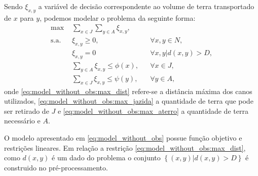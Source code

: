 Sendo $\xi_{x,y}$ a variável de decisão correspondente ao volume de terra
transportado de $x$ para $y$, podemos modelar o problema da seguinte forma:
\begin{subequations}
    \begin{align}
        \text{max } & \sum_{x \in J} \sum_{y \in A} \xi_{x,y},
        \label{eq:model_without_obs:obj_func} \\
        \text{s.a. } & \xi_{x,y} \geq 0, && \forall x, y \in N,
        \label{eq:model_without_obs:var} \\
        & \xi_{x,y} = 0 && \forall x, y | d(x,y) > D,
        \label{eq:model_without_obs:max_dist} \\
        & \sum_{y \in A} \xi_{x,y} \leq \phi(x), && \forall x \in J,
        \label{eq:model_without_obs:max_jazida} \\
        & \sum_{x \in J} \xi_{x,y} \leq \psi(y), && \forall y \in A,
        \label{eq:model_without_obs:max_aterro}
    \end{align}
    \label{eq:model_without_obs}
\end{subequations}
onde \eqref{eq:model_without_obs:max_dist} refere-se a distância máxima dos
canos utilizados, \eqref{eq:model_without_obs:max_jazida} a quantidade de terra
que pode ser retirado de $J$ e \eqref{eq:model_without_obs:max_aterro} a
quantidade de terra necessário e $A$.

O modelo apresentado em \eqref{eq:model_without_obs} possue função objetivo e
restrições lineares. Em relação a restrição
\eqref{eq:model_without_obs:max_dist}, como $d(x, y)$ é um dado do problema
o conjunto $\left\{ (x, y) | d(x, y) > D \right\}$ é construido no
pré-processamento.

